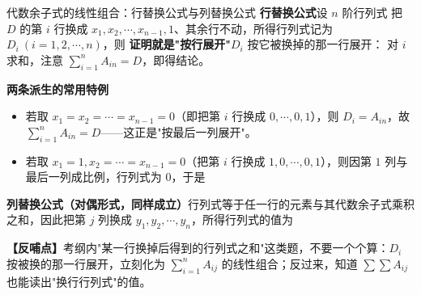\begin{fdeep}{代数余子式的线性组合：行替换公式与列替换公式}
\textbf{行替换公式}\quad 设 $n$ 阶行列式
把 $D$ 的第 $i$ 行换成 $x_1,x_2,\cdots,x_{n-1},1$、其余行不动，所得行列式记为 $D_i\ (i=1,2,\cdots,n)$，则
\textbf{证明就是"按行展开"}\quad $D_i$ 按它被换掉的那一行展开：
对 $i$ 求和，注意 $\sum\limits_{i=1}^{n}A_{in}=D$，即得结论。

\textbf{两条派生的常用特例}
\begin{itemize}
\item 若取 $x_1=x_2=\cdots=x_{n-1}=0$（即把第 $i$ 行换成 $0,\cdots,0,1$），则 $D_i=A_{in}$，故 $\sum\limits_{i=1}^{n}A_{in}=D$——这正是"按最后一列展开"。
\item 若取 $x_1=1,x_2=\cdots=x_{n-1}=0$（把第 $i$ 行换成 $1,0,\cdots,0,1$），则因第 $1$ 列与最后一列成比例，行列式为 $0$，于是
\end{itemize}

\textbf{列替换公式（对偶形式，同样成立）}\quad 行列式等于任一行的元素与其代数余子式乘积之和，因此把第 $j$ 列换成 $y_1,y_2,\cdots,y_n$，所得行列式的值为

\textbf{【反哺点】}考纲内"某一行换掉后得到的行列式之和"这类题，不要一个个算：$D_i$ 按被换的那一行展开，立刻化为 $\sum\limits_{i=1}^{n}A_{ij}$ 的线性组合；反过来，知道 $\sum\sum A_{ij}$ 也能读出"换行行列式"的值。
\end{fdeep}


